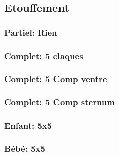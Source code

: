 

\subsection{Etouffement}
	\subsubsection{Partiel: Rien}
	\subsubsection{Complet: 5 claques}
	\subsubsection{Complet: 5 Comp ventre}
	\subsubsection{Complet: 5 Comp sternum}
	\subsubsection{Enfant: 5x5}
	\subsubsection{Bébé: 5x5}

